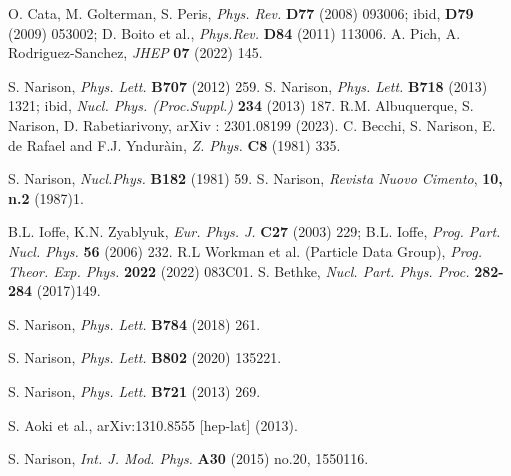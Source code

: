 
  O. Cata, M. Golterman, S. Peris, {\it Phys. Rev.} {\bf  D77} (2008) 093006; %
 ibid, %
   {\bf D79} (2009) 053002;
D. Boito et al., {\it Phys.Rev.} {\bf D84} (2011) 113006.
 A. Pich, A. Rodriguez-Sanchez, {\it JHEP} {\bf 07} (2022) 145.

S. Narison, {\it Phys. Lett.} {\bf B707} (2012)  259.
 S. Narison, {\it Phys. Lett.} {\bf B718} (2013) 1321; ibid, {\it Nucl. Phys. (Proc.Suppl.)} {\bf 234} (2013) 187. 
 R.M.  Albuquerque, S. Narison,  D. Rabetiarivony, arXiv : 2301.08199 (2023).
C. Becchi, S. Narison, E. de Rafael and F.J. 
Yndur\`ain, {\it Z. Phys.} {\bf C8} (1981) 335.

S. Narison,  {\it Nucl.Phys.} {\bf B182} (1981) 59.
 S. Narison, {\it Revista Nuovo Cimento}, {\bf 10, n.2} (1987)1. 

 B.L. Ioffe, K.N. Zyablyuk, {\it Eur. Phys. J.} {\bf C27} (2003) 229; 
B.L. Ioffe, {\it Prog. Part. Nucl. Phys.} {\bf 56} (2006) 232.
  R.L Workman et al. (Particle Data Group), {\it Prog. Theor. Exp. Phys.} {\bf 2022} (2022) 083C01.
  S. Bethke, {\it Nucl. Part. Phys. Proc.} {\bf 282-284} (2017)149. 
 
S. Narison,  {\it Phys. Lett.}  {\bf B784} (2018) 261.

 S. Narison, {\it Phys. Lett.} {\bf B802} (2020) 135221.

 S. Narison, {\it Phys. Lett.} {\bf B721} (2013) 269.


   S. Aoki et al., arXiv:1310.8555 [hep-lat] (2013).

 S. Narison, {\it Int. J. Mod. Phys.} {\bf A30} (2015) no.20, 1550116. %

